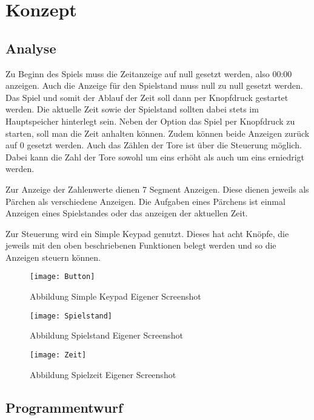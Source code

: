 \chapter{Konzept} 	%


\section{Analyse}

Zu Beginn des Spiels muss die Zeitanzeige auf null gesetzt werden, also 00:00 anzeigen. Auch die Anzeige für den Spielstand muss null zu null gesetzt werden. Das Spiel und somit der Ablauf der Zeit soll dann per Knopfdruck gestartet werden. Die aktuelle Zeit sowie der Spielstand sollten dabei stets im Hauptspeicher hinterlegt sein. Neben der Option das Spiel per Knopfdruck zu starten, soll man die Zeit anhalten können. Zudem können beide Anzeigen zurück auf 0 gesetzt werden. Auch das Zählen der Tore ist über die Steuerung möglich. Dabei kann die Zahl der Tore sowohl um eins erhöht als auch um eins erniedrigt werden. 

Zur Anzeige der Zahlenwerte dienen 7 Segment Anzeigen. Diese dienen jeweils als Pärchen als verschiedene Anzeigen. Die Aufgaben eines Pärchens ist einmal Anzeigen eines Spielstandes oder das anzeigen der aktuellen Zeit.

Zur Steuerung wird ein Simple Keypad genutzt. Dieses hat acht Knöpfe, die jeweils mit den oben beschriebenen Funktionen belegt werden und so die Anzeigen steuern können.

\begin{figure}[h]
	\centering
	\texttt{[image: Button]} 
	\caption{Abbildung Simple Keypad  Eigener Screenshot }
	\label{fig:Button}
\end{figure}

\begin{figure}[h]
	\centering
	\texttt{[image: Spielstand]} 
	\caption{Abbildung Spielstand  Eigener Screenshot }
	\label{fig:Spielstand}
\end{figure}

\begin{figure}[h]
	\centering
	\texttt{[image: Zeit]} 
	\caption{Abbildung Spielzeit  Eigener Screenshot }
	\label{fig:Zeit}
\end{figure}

\section{Programmentwurf}


